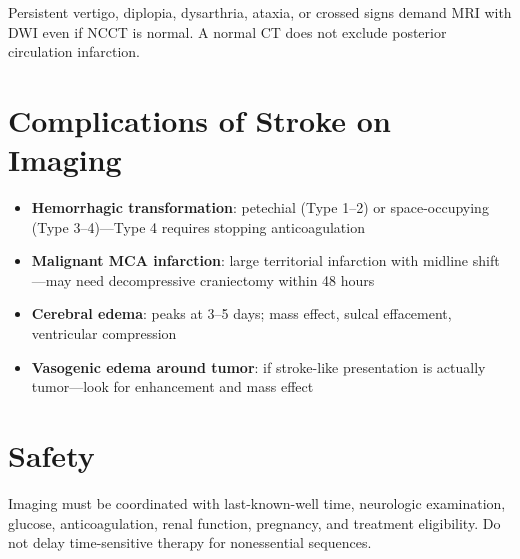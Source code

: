 \begin{pearlbox}
Persistent vertigo, diplopia, dysarthria, ataxia, or crossed signs demand MRI with DWI even if NCCT is normal. A normal CT does not exclude posterior circulation infarction.
\end{pearlbox}

\section{Complications of Stroke on Imaging}
\begin{itemize}
  \item \textbf{Hemorrhagic transformation}: petechial (Type 1--2) or space-occupying (Type 3--4)---Type 4 requires stopping anticoagulation
  \item \textbf{Malignant MCA infarction}: large territorial infarction with midline shift---may need decompressive craniectomy within 48 hours
  \item \textbf{Cerebral edema}: peaks at 3--5 days; mass effect, sulcal effacement, ventricular compression
  \item \textbf{Vasogenic edema around tumor}: if stroke-like presentation is actually tumor---look for enhancement and mass effect
\end{itemize}

\section{Safety}
Imaging must be coordinated with last-known-well time, neurologic examination, glucose, anticoagulation, renal function, pregnancy, and treatment eligibility. Do not delay time-sensitive therapy for nonessential sequences.

\clearpage
